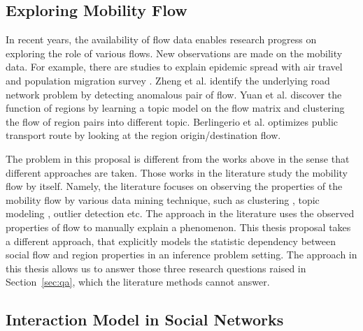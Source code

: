 \subsection{Exploring Mobility Flow}

In recent years, the availability of flow data enables research progress on exploring the role of various flows. New observations are made on the mobility data. For example, there are studies to explain epidemic spread with air travel \cite{huang2013global, tatem2014mapping} and population migration survey \cite{pindolia2013demographics}. Zheng et al. \cite{zheng2011urban} identify the underlying road network problem by detecting anomalous pair of flow. Yuan et al. \cite{yuan2012discovering} discover the function of regions by learning a topic model on the flow matrix and clustering the flow of region pairs into different topic.  Berlingerio et al. \cite{berlingerio2013allaboard} optimizes public transport route by looking at the region origin/destination flow. 



The problem in this proposal is different from the works above in the sense that different approaches are taken. Those works in the literature study the mobility flow by itself. Namely, the literature focuses on observing the properties of the mobility flow by various data mining technique, such as clustering \cite{berlingerio2013allaboard}, topic modeling \cite{yuan2012discovering}, outlier detection \cite{zheng2011urban} etc.  The approach in the literature uses the observed properties of flow to manually explain a phenomenon. This thesis proposal takes a different approach, that explicitly models the statistic dependency between social flow and region properties in an inference problem setting. The approach in this thesis allows us to answer those three research questions raised in Section~\ref{sec:qa}, which the literature methods cannot answer.





\subsection{Interaction Model in Social Networks}


